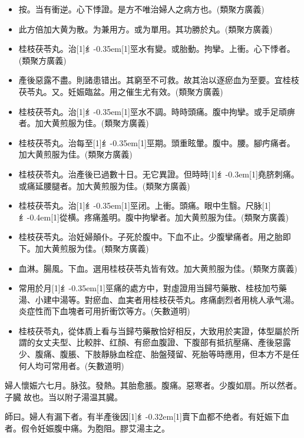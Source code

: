 \documentclass[oneside,b4paper]{ctexbook}
\begin{document}
\begin{flushleft}
\begin{itemize}
\item 按。当有衝逆。心下悸證。是方不唯治婦人之病方也。(類聚方廣義)
\item 此方倍加大黄为散。为兼用方。或为單用。其功勝於丸。(類聚方廣義)
\item 桂枝茯苓丸。治{\hbox{\scalebox{0.68}[1]{纟}\kern-0.35em\scalebox{0.64}[1]{巠}}}水有變。或胎動。拘攣。上衝。心下悸者。(類聚方廣義)
\item 產後惡露不盡。則諸患错出。其窮至不可救。故其治以逐瘀血为至要。宜桂枝茯苓丸。又。妊娠臨盆。用之催生尤有效。(類聚方廣義)
\item 桂枝茯苓丸。治{\hbox{\scalebox{0.68}[1]{纟}\kern-0.35em\scalebox{0.64}[1]{巠}}}水不調。時時頭痛。腹中拘攣。或手足頑痹者。加大黄煎服为佳。(類聚方廣義)
\item 桂枝茯苓丸。治每至{\hbox{\scalebox{0.68}[1]{纟}\kern-0.35em\scalebox{0.64}[1]{巠}}}期。頭重眩暈。腹中。腰。腳㽲痛者。加大黄煎服为佳。(類聚方廣義)
\item 桂枝茯苓丸。治產後已過數十日。无它異證。但時時{\hbox{\scalebox{0.6}[1]{纟}\kern-0.3em\scalebox{0.63}[1]{堯}}}脐刺痛。或痛延腰腿者。加大黄煎服为佳。(類聚方廣義)
\item 桂枝茯苓丸。治{\hbox{\scalebox{0.68}[1]{纟}\kern-0.35em\scalebox{0.64}[1]{巠}}}闭。上衝。頭痛。眼中生翳。尺脉{\hbox{\scalebox{0.6}[1]{纟}\kern-0.4em\scalebox{0.7}[1]{從}}}横。疼痛羞明。腹中拘攣者。加大黄煎服为佳。(類聚方廣義)
\item 桂枝茯苓丸。治妊婦顛仆。子死於腹中。下血不止。少腹攣痛者。用之胎即下。加大黄煎服为佳。(類聚方廣義)
\item 血淋。腸風。下血。選用桂枝茯苓丸皆有效。加大黄煎服为佳。(類聚方廣義)
\item 常用於月{\hbox{\scalebox{0.68}[1]{纟}\kern-0.35em\scalebox{0.64}[1]{巠}}}痛的處方中，對虛證用当歸芍藥散、桂枝加芍藥湯、小建中湯等。對瘀血、血実者用桂枝茯苓丸。疼痛劇烈者用桃人承气湯。炎症性而下血塊者可用折衝饮等方。(矢數道明)
\item 桂枝茯苓丸，從体貭上看与当歸芍藥散恰好相反，大致用於実證，体型屬於所謂的女丈夫型、比較胖、红顏、有瘀血腹證、下腹部有抵抗壓痛、產後惡露少、腹痛、腹脹、下肢靜脉血栓症、胎盤殘留、死胎等時應用，但本方不是任何人均可常用者。(矢數道明)
\end{itemize}

婦人懷娠六七月。脉弦。發熱。其胎愈脹。腹痛。惡寒者。少腹如扇。所以然者。子臓{𫔭}故也。当以附子湯温其臓。

師曰。婦人有漏下者。有半產後因{\hbox{\scalebox{0.6}[1]{纟}\kern-0.32em\scalebox{0.7}[1]{賣}}}下血都不绝者。有妊娠下血者。假令妊娠腹中痛。为胞阻。膠艾湯主之。


\end{flushleft}
\end{document}
